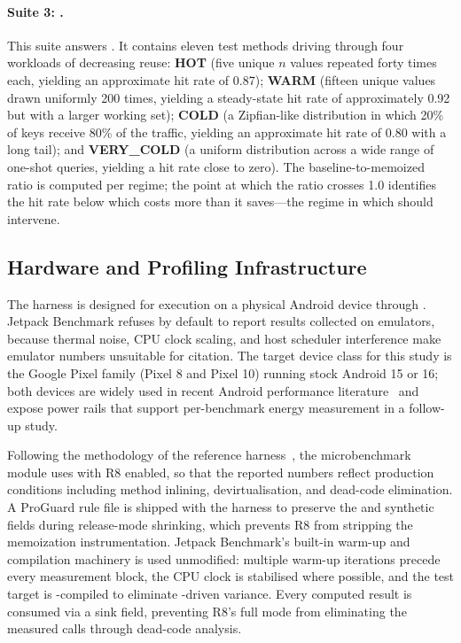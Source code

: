 \paragraph{Suite 3: .} This suite answers . It contains eleven test methods driving  through four workloads of decreasing reuse: \textbf{HOT} (five unique $n$ values repeated forty times each, yielding an approximate hit rate of 0.87); \textbf{WARM} (fifteen unique values drawn uniformly 200 times, yielding a steady-state hit rate of approximately 0.92 but with a larger working set); \textbf{COLD} (a Zipfian-like distribution in which 20\% of keys receive 80\% of the traffic, yielding an approximate hit rate of 0.80 with a long tail); and \textbf{VERY\_COLD} (a uniform distribution across a wide range of one-shot queries, yielding a hit rate close to zero). The baseline-to-memoized ratio is computed per regime; the point at which the ratio crosses 1.0 identifies the hit rate below which  costs more than it saves---the regime in which  should intervene.

\subsection{Hardware and Profiling Infrastructure}\label{sec:hardware}

The harness is designed for execution on a physical Android device through . Jetpack Benchmark refuses by default to report results collected on emulators, because thermal noise, CPU clock scaling, and host scheduler interference make emulator numbers unsuitable for citation. The target device class for this study is the Google Pixel family (Pixel 8 and Pixel 10) running stock Android 15 or 16; both devices are widely used in recent Android performance literature~\cite{empirical_rua} and expose \odpm power rails that support per-benchmark energy measurement in a follow-up study.

Following the methodology of the reference harness~\cite{empirical_rua}, the microbenchmark module uses  with R8 enabled, so that the reported numbers reflect production conditions including method inlining, devirtualisation, and dead-code elimination. A ProGuard rule file is shipped with the harness to preserve the  and  synthetic fields during release-mode shrinking, which prevents R8 from stripping the memoization instrumentation. Jetpack Benchmark's built-in warm-up and \aot compilation machinery is used unmodified: multiple warm-up iterations precede every measurement block, the CPU clock is stabilised where possible, and the test target is \aot-compiled to eliminate \jit-driven variance. Every computed result is consumed via a  sink field, preventing R8's full mode from eliminating the measured calls through dead-code analysis.

